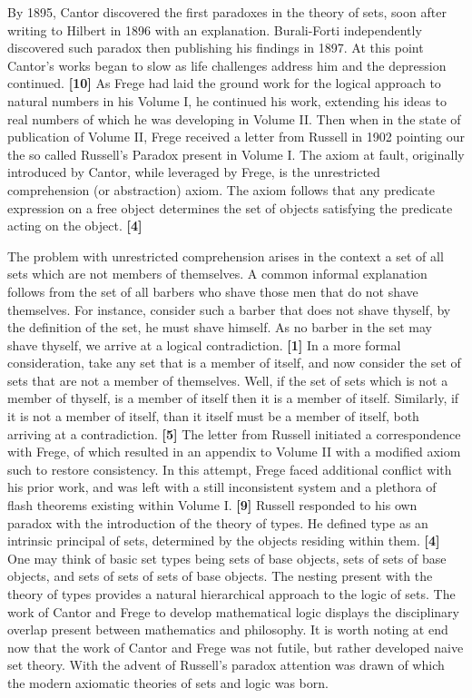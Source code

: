 \documentclass[12pt]{article}
\begin{document}
\hspace{5mm}
By 1895, Cantor discovered the first paradoxes in the theory of sets, soon after writing to Hilbert in 1896 with an explanation. 
Burali-Forti independently discovered such paradox then publishing his findings in 1897. 
At this point Cantor's works began to slow as life challenges address him and the depression continued. \textbf{[10]} 
As Frege had laid the ground work for the logical approach to natural numbers in his Volume I, he continued his work, extending his ideas to real numbers of which he was developing in Volume II. 
Then when in the state of publication of Volume II, Frege received a letter from Russell in 1902 pointing our the so called Russell's Paradox present in Volume I. 
The axiom at fault, originally introduced by Cantor, while leveraged by Frege, is the unrestricted comprehension (or abstraction) axiom. 
The axiom follows that any predicate expression on a free object determines the set of objects satisfying the predicate acting on the object. \textbf{[4]} 

\hspace{5mm}
The problem with unrestricted comprehension arises in the context a set of all sets which are not members of themselves. 
A common informal explanation follows from the set of all barbers who shave those men that do not shave themselves. 
For instance, consider such a barber that does not shave thyself, by the definition of the set, he must shave himself. 
As no barber in the set may shave thyself, we arrive at a logical contradiction. \textbf{[1]}
In a more formal consideration, take any set that is a member of itself, and now consider the set of sets that are not a member of themselves.
Well, if the set of sets which is not a member of thyself, is a member of itself then it is a member of itself. 
Similarly, if it is not a member of itself, than it itself must be a member of itself, both arriving at a contradiction. \textbf{[5]}
The letter from Russell initiated a correspondence with Frege, of which resulted in an appendix to Volume II with a modified axiom such to restore consistency. 
In this attempt, Frege faced additional conflict with his prior work, and was left with a still inconsistent system and a plethora of flash theorems existing within Volume I. \textbf{[9]} 
Russell responded to his own paradox with the introduction of the theory of types. 
He defined type as an intrinsic principal of sets, determined by the objects residing within them. \textbf{[4]}
One may think of basic set types being sets of base objects, sets of sets of base objects, and sets of sets of sets of base objects. 
The nesting present with the theory of types provides a natural hierarchical approach to the logic of sets. 
The work of Cantor and Frege to develop mathematical logic displays the disciplinary overlap present between mathematics and philosophy. 
It is worth noting at end now that the work of Cantor and Frege was not futile, but rather developed naive set theory. 
With the advent of Russell's paradox attention was drawn of which the modern axiomatic theories of sets and logic was born. 
\end{document}
